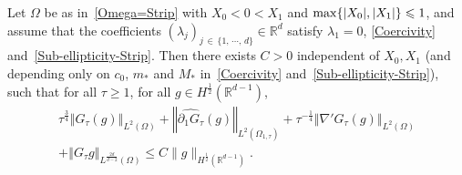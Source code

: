 \documentclass[10pt]{amsart}
\theoremstyle{definition}\newtheorem{defi}[theo]{Definition}\newtheorem{rema}[theo]{Remark}\newtheorem{exam}[theo]{Example}\newtheorem{exem}[theo]{Example}\newtheorem{nota}[theo]{Notation}
\newcommand*\R{\mathbb{R}}
\newcommand{\norm}[1]{\left\Vert#1\right\Vert}
\renewcommand{\leq}{\leqslant}
\renewcommand{\geq}{\geqslant}
\begin{document}
\begin{prop}\label{Prop-OpNorm-Est-G-tau}
Let $\Omega$ be as in~\eqref{Omega=Strip} with $X_0 \! <\! 0\! <\! X_1$ and $\max\{ |X_0|, |X_1|\}\linebreak \leq 1$, and assume that the coefficients $(\lambda_j)_{j\, \in\,\{1,\,\cdots,\,d\}} \in \R^d$ satisfy $\lambda_1 = 0$, \eqref{Coercivity} and~\eqref{Sub-ellipticity-Strip}. Then there exists $C>0$ independent of $X_0, X_1$ (and depending only on $c_0$, $m_*$ and $M_*$ in~\eqref{Coercivity} and~\eqref{Sub-ellipticity-Strip}), such that for all $\tau \geq 1$, for all $g \in H^{\frac{1}{2}}(\R^{d-1})$,
\begin{multline}\label{Est-G-tau-g-H-1/2-L-2_*}
\tau^{\frac{3}{4}} \norm{G_{\tau} (g)}_{L^2(\Omega)} +
\norm{\widehat{\partial_1 G_\tau} (g)}_{L^2(\Omega_{1, \tau})} 
+
\tau^{-\frac{1}{4}} \norm{\nabla' G_\tau (g)}_{L^2(\Omega)}\\
+
\norm{G_{\tau} g}_{L^{\frac{2d}{d-2}}(\Omega)}
\leq C \| g \|_{H^{\frac{1}{2}}\left(\R^{d-1}\right)}.
\end{multline}
\end{prop}
\end{document}
